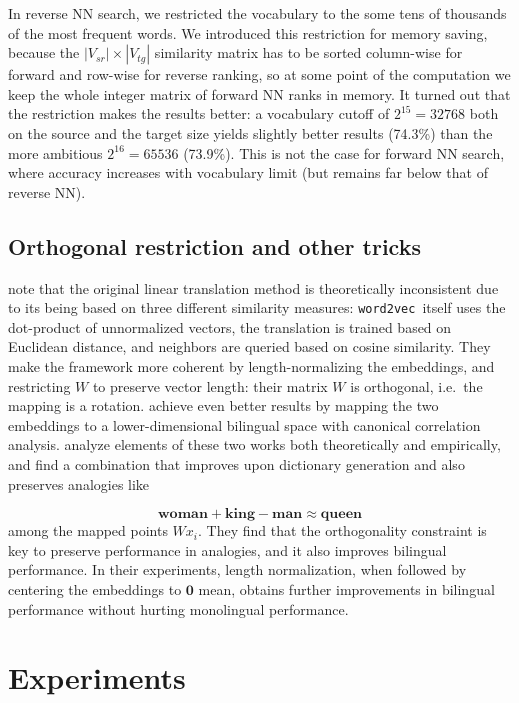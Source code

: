 \documentclass[11pt]{article}
\begin{document}
In reverse NN search, we restricted the vocabulary to the some tens of
thousands of the most frequent words. We introduced this restriction for memory
saving, because the $|V_{sr}|\times|V_{tg}|$ similarity matrix has
to be sorted column-wise for forward and row-wise for reverse ranking, so at
some point of the computation we keep the whole integer matrix of forward NN
ranks in memory. It turned out that the restriction makes the results better: a
vocabulary cutoff of $2^{15}=32768$ both on the source and the target size
yields slightly better results (74.3\%) than the more ambitious $2^{16}=65536$
(73.9\%). This is not the case for forward NN search, where accuracy increases
with vocabulary limit (but remains far below that of reverse NN).

\subsection{Orthogonal restriction and other tricks}

\newcommand{\wordtovec}{\texttt{word2vec}}

\cite{Xing:2015} note that the original linear translation method is
theoretically inconsistent due to its being based on three different similarity measures:
\wordtovec~itself uses the dot-product of unnormalized vectors, the translation
is trained based on Euclidean distance, and neighbors are queried based on
cosine similarity. They make the framework more coherent by length-normalizing
the embeddings, and restricting $W$ to preserve vector length: their matrix
$W$ is orthogonal, i.e.~the mapping is a rotation.  \cite{Faruqui:2014} achieve
even better results by mapping the two embeddings to a lower-dimensional
bilingual space with canonical correlation analysis.  \cite{Artetxe:2016}
analyze elements of these two works both theoretically and empirically, and
find a combination that improves upon dictionary generation and also preserves
analogies \citep{Mikolov:2013l} like

\[\mathbf{woman} + \mathbf{king}- \mathbf{man}  \approx \mathbf{queen}\]
among the mapped points $Wx_i$. They find that the
orthogonality constraint is key to preserve performance in analogies, and it
also improves bilingual performance.  In their experiments, length
normalization, when followed by centering the embeddings to $\mathbf 0$ mean,
obtains further improvements in bilingual performance without hurting
monolingual performance.

\section{Experiments}
\label{sec:exper}
\end{document}
